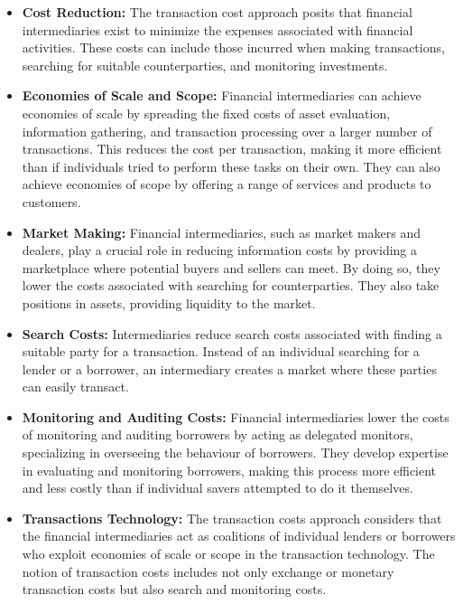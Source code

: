 \begin{itemize}
    \item \textbf{Cost Reduction:} The transaction cost approach posits that financial intermediaries exist to minimize the expenses associated with financial activities. These costs can include those incurred when making transactions, searching for suitable counterparties, and monitoring investments.
    \item \textbf{Economies of Scale and Scope:} Financial intermediaries can achieve economies of scale by spreading the fixed costs of asset evaluation, information gathering, and transaction processing over a larger number of transactions. This reduces the cost per transaction, making it more efficient than if individuals tried to perform these tasks on their own. They can also achieve economies of scope by offering a range of services and products to customers.
    \item \textbf{Market Making:} Financial intermediaries, such as market makers and dealers, play a crucial role in reducing information costs by providing a marketplace where potential buyers and sellers can meet. By doing so, they lower the costs associated with searching for counterparties. They also take positions in assets, providing liquidity to the market.
    \item \textbf{Search Costs:} Intermediaries reduce search costs associated with finding a suitable party for a transaction. Instead of an individual searching for a lender or a borrower, an intermediary creates a market where these parties can easily transact.
    \item \textbf{Monitoring and Auditing Costs:} Financial intermediaries lower the costs of monitoring and auditing borrowers by acting as delegated monitors, specializing in overseeing the behaviour of borrowers. They develop expertise in evaluating and monitoring borrowers, making this process more efficient and less costly than if individual savers attempted to do it themselves.
    \item \textbf{Transactions Technology:} The transaction costs approach considers that the financial intermediaries act as coalitions of individual lenders or borrowers who exploit economies of scale or scope in the transaction technology. The notion of transaction costs includes not only exchange or monetary transaction costs but also search and monitoring costs.
\end{itemize}

